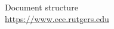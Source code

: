 \documentclass{scrartcl}
\begin{document}
\newpage


\printbibliography[heading=bibintoc]

Document structure  \\
\url{https://www.ece.rutgers.edu}

\pagebreak









  	
  
  	

  	
  	
  	
  
  	
  	
  	
  
  	
  	
  
  	


  	





	
	
	




 









 

 
\end{document}
